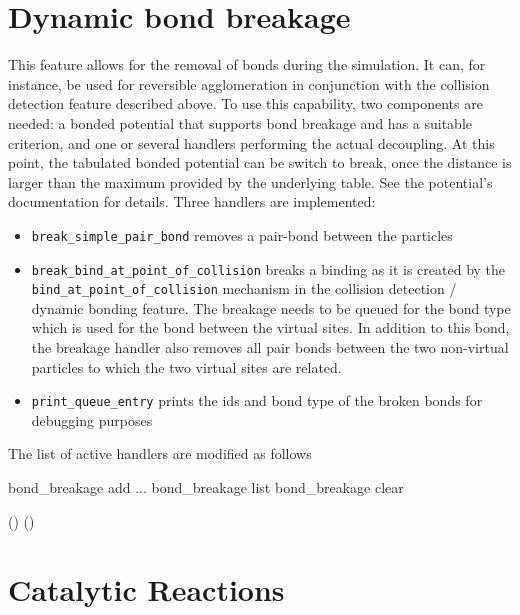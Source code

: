 \section{Dynamic bond breakage}
\label{bondbreakage}

This feature allows for the removal of bonds during the simulation. It can, for instance, be used for reversible agglomeration in conjunction with the collision  detection feature described above.
To use this capability, two components are needed: a bonded potential that supports bond breakage and has a suitable criterion, and one or several handlers performing the actual decoupling.
At this point, the tabulated bonded potential can be switch to break, once the distance is larger than the maximum provided by the underlying table. See the potential's documentation for details.
Three handlers are implemented:
\begin{itemize}
\item \texttt{break_simple_pair_bond} removes a pair-bond between the particles
\item \texttt{break_bind_at_point_of_collision} breaks a binding as it is created by the \texttt{bind_at_point_of_collision} mechanism in the collision detection / dynamic bonding feature. The breakage needs to be queued for the bond type which is used for the bond between the virtual sites. In addition to this bond, the breakage handler also removes all pair bonds between the two non-virtual particles to which the two virtual sites are related.
\item \texttt{print_queue_entry} prints the ids and bond type of the broken bonds for debugging purposes
\end{itemize}

The list of active handlers are modified as follows
\begin{essyntax}
 bond\_breakage add   ...
 bond\_breakage list
 bond\_breakage clear
\end{essyntax}


\begin{pysyntax}
   {()}
   {()}

\end{pysyntax}

\section{Catalytic Reactions}
\label{sec:Reactions}

